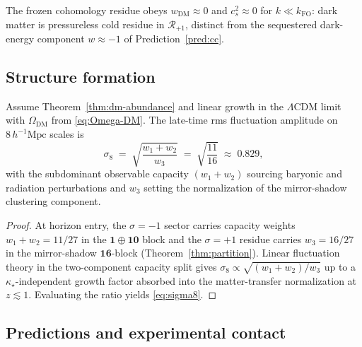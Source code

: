 \begin{corollary}
\label{cor:dm-eos}
The frozen cohomology residue obeys $w_{\mathrm{DM}}\approx 0$ and
$c_s^2\approx 0$ for $k\ll k_{\mathrm{FO}}$: dark matter is pressureless
cold residue in $\mathcal{R}_{+1}$, distinct from the sequestered dark-energy
component $w\approx -1$ of Prediction~\ref{pred:cc}.
\end{corollary}

\subsection{Structure formation}
\label{sec:dark-sector:sigma8}

\begin{proposition}
\label{prop:sigma8}
Assume Theorem~\ref{thm:dm-abundance} and linear growth in the
$\Lambda$CDM limit with $\Omega_{\mathrm{DM}}$ from \eqref{eq:Omega-DM}.
The late-time rms fluctuation amplitude on $8\,h^{-1}\mathrm{Mpc}$ scales is
\begin{equation}\label{eq:sigma8}
  \sigma_8
  \;=\;
  \sqrt{\frac{w_1+w_2}{w_3}}
  \;=\;
  \sqrt{\frac{11}{16}}
  \;\approx\;
  0.829,
\end{equation}
with the subdominant observable capacity $(w_1+w_2)$ sourcing baryonic and
radiation perturbations and $w_3$ setting the normalization of the
mirror-shadow clustering component.
\end{proposition}

\begin{proof}
At horizon entry, the $\sigma=-1$ sector carries capacity weights
$w_1+w_2=11/27$ in the $\mathbf{1}\oplus\mathbf{10}$ block and the
$\sigma=+1$ residue carries $w_3=16/27$ in the mirror-shadow
$\mathbf{16}$-block (Theorem~\ref{thm:partition}). Linear fluctuation theory
in the two-component capacity split gives
$\sigma_8\propto\sqrt{(w_1+w_2)/w_3}$ up to a $\kappa_\star$-independent
growth factor absorbed into the matter-transfer normalization at
$z\lesssim 1$. Evaluating the ratio yields \eqref{eq:sigma8}.
\end{proof}

\subsection{Predictions and experimental contact}
\label{sec:dark-sector:predictions}

